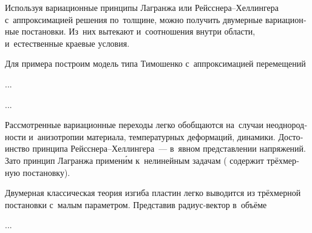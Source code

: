 \begin{otherlanguage}{russian}

Используя вариационные принципы Лагранжа или Рейсснера--Хеллингера с~аппроксимацией решения по~толщине, можно получить двумерные вариационные постановки. Из~них вытекают и~соотношения внутри области, и~естественные краевые условия.

Для примера построим модель типа Тимошенко с~аппроксимацией перемещений

...


...

Рассмотренные вариационные переходы легко обобщаются на~случаи неоднородности и~анизотропии материала, температурных деформаций, динамики. Достоинство принципа Рейсснера--Хеллингера~--- в~явном представлении напряжений. \hbox{Зато} принцип Лагранжа примен\'{и}м к~нелинейным задачам ( содержит трёхмерную постановку).

\end{otherlanguage}



\begin{otherlanguage}{russian}

Двумерная классическая теория изгиба пластин легко выводится из трёхмерной постановки с~малым параметром. Представив радиус\hbox{-}вектор в~объёме

...



\end{otherlanguage}



